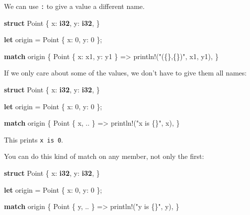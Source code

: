 \documentclass[a4paper,]{book}
\newenvironment{Shaded}{\begin{snugshade}}{\end{snugshade}}
\newcommand{\KeywordTok}[1]{\textcolor[rgb]{0.13,0.29,0.53}{\textbf{{#1}}}}
\newcommand{\DecValTok}[1]{\textcolor[rgb]{0.00,0.00,0.81}{{#1}}}
\newcommand{\StringTok}[1]{\textcolor[rgb]{0.31,0.60,0.02}{{#1}}}
\newcommand{\OtherTok}[1]{\textcolor[rgb]{0.56,0.35,0.01}{{#1}}}
\newcommand{\NormalTok}[1]{{#1}}
\begin{document}
We can use \texttt{:} to give a value a different name.

\begin{Shaded}
\begin{Highlighting}[]
\KeywordTok{struct} \NormalTok{Point \{}
    \NormalTok{x: }\KeywordTok{i32}\NormalTok{,}
    \NormalTok{y: }\KeywordTok{i32}\NormalTok{,}
\NormalTok{\}}

\KeywordTok{let} \NormalTok{origin = Point \{ x: }\DecValTok{0}\NormalTok{, y: }\DecValTok{0} \NormalTok{\};}

\KeywordTok{match} \NormalTok{origin \{}
    \NormalTok{Point \{ x: x1, y: y1 \} => }\OtherTok{println!}\NormalTok{(}\StringTok{"(\{\},\{\})"}\NormalTok{, x1, y1),}
\NormalTok{\}}
\end{Highlighting}
\end{Shaded}

If we only care about some of the values, we don't have to give them all
names:

\begin{Shaded}
\begin{Highlighting}[]
\KeywordTok{struct} \NormalTok{Point \{}
    \NormalTok{x: }\KeywordTok{i32}\NormalTok{,}
    \NormalTok{y: }\KeywordTok{i32}\NormalTok{,}
\NormalTok{\}}

\KeywordTok{let} \NormalTok{origin = Point \{ x: }\DecValTok{0}\NormalTok{, y: }\DecValTok{0} \NormalTok{\};}

\KeywordTok{match} \NormalTok{origin \{}
    \NormalTok{Point \{ x, .. \} => }\OtherTok{println!}\NormalTok{(}\StringTok{"x is \{\}"}\NormalTok{, x),}
\NormalTok{\}}
\end{Highlighting}
\end{Shaded}

This prints \texttt{x\ is\ 0}.

You can do this kind of match on any member, not only the first:

\begin{Shaded}
\begin{Highlighting}[]
\KeywordTok{struct} \NormalTok{Point \{}
    \NormalTok{x: }\KeywordTok{i32}\NormalTok{,}
    \NormalTok{y: }\KeywordTok{i32}\NormalTok{,}
\NormalTok{\}}

\KeywordTok{let} \NormalTok{origin = Point \{ x: }\DecValTok{0}\NormalTok{, y: }\DecValTok{0} \NormalTok{\};}

\KeywordTok{match} \NormalTok{origin \{}
    \NormalTok{Point \{ y, .. \} => }\OtherTok{println!}\NormalTok{(}\StringTok{"y is \{\}"}\NormalTok{, y),}
\NormalTok{\}}
\end{Highlighting}
\end{Shaded}
\end{document}
